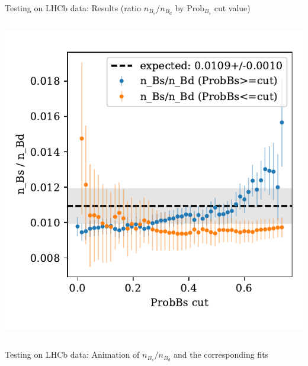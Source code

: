 \documentclass[aspectratio=1610, 10pt]{beamer}
\begin{document}
\begin{frame}{Testing on LHCb data: Results (ratio $n_{B_s}/n_{B_d}$ by $\text{Prob}_{B_s}$ cut value)}
  \centering
  \begin{columns}
    \begin{column}{0.5\textwidth}
      \centering
      \includegraphics[width=\textwidth]{images/ratio_data.pdf}
    \end{column}
  \end{columns}
\end{frame}

\begin{frame}{Testing on LHCb data: Animation of $n_{B_s}/n_{B_d}$ and the corresponding fits}
\end{frame}
\end{document}

